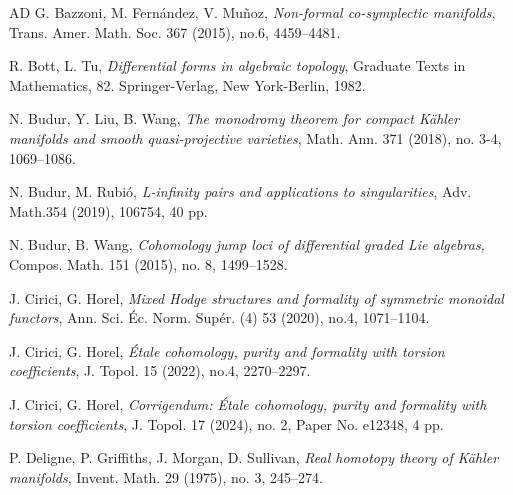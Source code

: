 \documentclass[12pt,leqno,twoside]{amsart}
\theoremstyle{plain}
\theoremstyle{definition}
\begin{document}
\begin{thebibliography}{AD}
 G. Bazzoni, M. Fern\'andez, V. Mu\~noz, {\it Non-formal co-symplectic manifolds}, Trans. Amer. Math. Soc. 367 (2015), no.6, 4459--4481.

 R. Bott, L. Tu, {\it Differential forms in algebraic topology}, Graduate Texts in Mathematics, 82. Springer-Verlag, New York-Berlin, 1982.

 N. Budur, Y. Liu, B. Wang, {\it The monodromy theorem for compact K\"ahler manifolds and smooth quasi-projective varieties},  Math. Ann. 371 (2018), no. 3-4, 1069--1086.

 N. Budur, M. Rubi\'o, {\it L-infinity pairs and applications to singularities}, Adv. Math.354 (2019), 106754, 40 pp.




 N. Budur, B. Wang, {\it Cohomology jump loci of differential graded Lie algebras,}  Compos. Math. 151 (2015), no. 8, 1499--1528.

 J. Cirici, G. Horel, {\it Mixed Hodge structures and formality of symmetric monoidal functors}, Ann. Sci. \'Ec. Norm. Sup\'er. (4) 53 (2020), no.4, 1071--1104.

 J. Cirici, G. Horel, {\it \'Etale cohomology, purity and formality with torsion coefficients}, J. Topol. 15 (2022), no.4, 2270--2297.

 J. Cirici, G. Horel, {\it Corrigendum: \'Etale cohomology, purity and formality with torsion coefficients}, J. Topol. 17 (2024), no. 2, Paper No. e12348, 4 pp.



 P. Deligne, P. Griffiths, J. Morgan, D. Sullivan, {\it Real homotopy theory of K\"ahler manifolds},  Invent. Math. 29 (1975), no. 3, 245--274.






\end{thebibliography}
\end{document}
